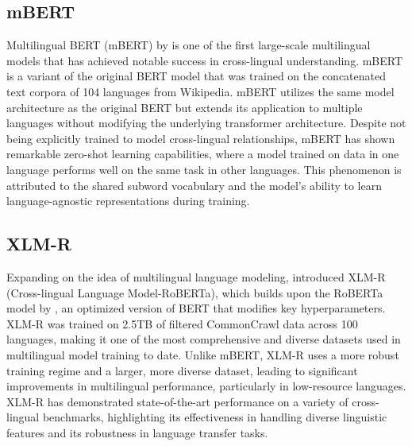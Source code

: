 \subsection{mBERT}
Multilingual BERT (mBERT) by \citet{devlin2018bert} is one of the first large-scale multilingual models that has achieved notable success in cross-lingual understanding. mBERT is a variant of the original BERT model that was trained on the concatenated text corpora of 104 languages from Wikipedia. mBERT utilizes the same model architecture as the original BERT but extends its application to multiple languages without modifying the underlying transformer architecture. Despite not being explicitly trained to model cross-lingual relationships, mBERT has shown remarkable zero-shot learning capabilities, where a model trained on data in one language performs well on the same task in other languages. This phenomenon is attributed to the shared subword vocabulary and the model's ability to learn language-agnostic representations during training.

\subsection{XLM-R}
Expanding on the idea of multilingual language modeling, \citet{conneau2020unsupervised} introduced XLM-R (Cross-lingual Language Model-RoBERTa), which builds upon the RoBERTa model by \citet{liu2019roberta}, an optimized version of BERT that modifies key hyperparameters. XLM-R was trained on 2.5TB of filtered CommonCrawl data across 100 languages, making it one of the most comprehensive and diverse datasets used in multilingual model training to date. Unlike mBERT, XLM-R uses a more robust training regime and a larger, more diverse dataset, leading to significant improvements in multilingual performance, particularly in low-resource languages. XLM-R has demonstrated state-of-the-art performance on a variety of cross-lingual benchmarks, highlighting its effectiveness in handling diverse linguistic features and its robustness in language transfer tasks.
